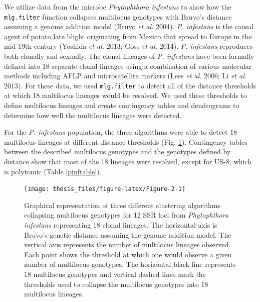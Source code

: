 \documentclass[double,12pt]{beavtex}
\begin{document}
  We utilize data from the microbe \emph{Phytophthora infestans} to show
  how the \texttt{mlg.filter} function collapses multilocus genotypes with
  Bruvo's distance assuming a genome addition model (Bruvo \emph{et al.}
  2004). \emph{P. infestans} is the causal agent of potato late blight
  originating from Mexico that spread to Europe in the mid 19th century
  (Yoshida \emph{et al.} 2013; Goss \emph{et al.} 2014). \emph{P.
  infestans} reproduces both clonally and sexually. The clonal lineages of
  \emph{P. infestans} have been formally defined into 18 separate clonal
  lineages using a combination of various molecular methods including AFLP
  and microsatellite markers (Lees \emph{et al.} 2006; Li \emph{et al.}
  2013). For these data, we used \texttt{mlg.filter} to detect all of the
  distance thresholds at which 18 multilocus lineages would be resolved.
  We used these thresholds to define multilocus lineages and create
  contingency tables and dendrograms to determine how well the multilocus
  lineages were detected.
  
  For the \emph{P. infestans} population, the three algorithms were able
  to detect 18 multilocus lineages at different distance thresholds (Fig.
  \ref{fig:Figure-2}). Contingency tables between the described multilocus
  genotypes and the genotypes defined by distance show that most of the 18
  lineages were resolved, except for US-8, which is polytomic (Table
  \ref{pinftable}).
  
  \begin{figure}
  
  {\centering \texttt{[image: thesis\_files/figure-latex/Figure-2-1]} 
  
  }
  
  \caption[Graphical representation of three different clustering algorithms
  collapsing multilocus genotypes for 12 SSR loci from \emph{Phytophthora
  infestans} representing 18 clonal lineages.]{Graphical representation of three different clustering algorithms
  collapsing multilocus genotypes for 12 SSR loci from \emph{Phytophthora
  infestans} representing 18 clonal lineages. The horizontal axis is
  Bruvo's genetic distance assuming the genome addition model. The
  vertical axis represents the number of multilocus lineages observed.
  Each point shows the threshold at which one would observe a given number
  of multilocus genotypes. The horizontal black line represents 18
  multilocus genotypes and vertical dashed lines mark the thresholds used
  to collapse the multilocus genotypes into 18 multilocus lineages.}\label{fig:Figure-2}
  \end{figure}
  
\end{document}

